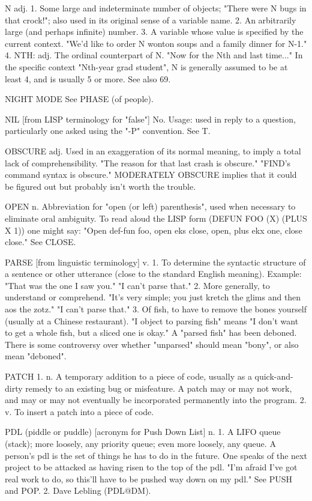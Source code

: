 N adj. 1. Some large and indeterminate number of objects; "There were
   N bugs in that crock!"; also used in its original sense of a
   variable name.  2. An arbitrarily large (and perhaps infinite)
   number.  3. A variable whose value is specified by the current
   context.  "We'd like to order N wonton soups and a family dinner
   for N-1."  4. NTH: adj. The ordinal counterpart of N. "Now for the
   Nth and last time..."  In the specific context "Nth-year grad
   student", N is generally assumed to be at least 4, and is usually 5
   or more.  See also 69.

NIGHT MODE  See PHASE (of people).

NIL [from LISP terminology for "false"] No.  Usage: used in reply to a
   question, particularly one asked using the "-P" convention.	See T.

OBSCURE adj. Used in an exaggeration of its normal meaning, to imply a
   total lack of comprehensibility.  "The reason for that last crash
   is obscure."	 "FIND's command syntax is obscure."  MODERATELY
   OBSCURE implies that it could be figured out but probably isn't
   worth the trouble.

OPEN n. Abbreviation for "open (or left) parenthesis", used when
   necessary to eliminate oral ambiguity.  To read aloud the LISP form
   (DEFUN FOO (X) (PLUS X 1)) one might say: "Open def-fun foo, open
   eks close, open, plus ekx one, close close."	 See CLOSE.

PARSE [from linguistic terminology] v. 1. To determine the syntactic
   structure of a sentence or other utterance (close to the standard
   English meaning).  Example: "That was the one I saw you."  "I can't
   parse that."	 2. More generally, to understand or comprehend.
   "It's very simple; you just kretch the glims and then aos the
   zotz."  "I can't parse that."  3. Of fish, to have to remove the
   bones yourself (usually at a Chinese restaurant).  "I object to
   parsing fish" means "I don't want to get a whole fish, but a sliced
   one is okay."  A "parsed fish" has been deboned.  There is some
   controversy over whether "unparsed" should mean "bony", or also
   mean "deboned".

PATCH 1. n. A temporary addition to a piece of code, usually as a
   quick-and-dirty remedy to an existing bug or misfeature.  A patch
   may or may not work, and may or may not eventually be incorporated
   permanently into the program.  2. v. To insert a patch into a piece
   of code.

PDL (piddle or puddle) [acronym for Push Down List] n. 1. A LIFO queue
   (stack); more loosely, any priority queue; even more loosely, any
   queue.  A person's pdl is the set of things he has to do in the
   future.  One speaks of the next project to be attacked as having
   risen to the top of the pdl.	 "I'm afraid I've got real work to do,
   so this'll have to be pushed way down on my pdl."  See PUSH and
   POP.	 2. Dave Lebling (PDL@DM).

